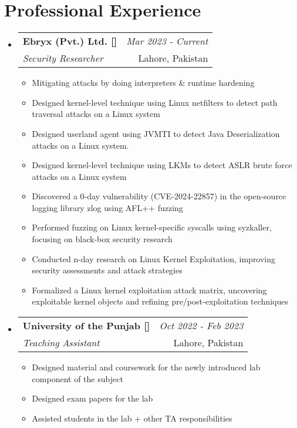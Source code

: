 \documentclass[a4paper,11pt]{article}
\makeatletter
\newcommand{\resumeSubheading}[4]{
\vspace{0.5mm}\item
    \begin{tabular*}{0.98\textwidth}[t]{l@{\extracolsep{\fill}}r}
        \textbf{#1} & \textit{\footnotesize{#4}} \\
        \textit{\footnotesize{#3}} &  \footnotesize{#2}\\
    \end{tabular*}
    \vspace{-2.4mm}
}
\newcommand{\resumeSubHeadingListStart}{\begin{itemize}[leftmargin=*,labelsep=1mm]}
\newcommand{\resumeItemListStart}{\begin{itemize}[leftmargin=*,labelsep=1mm,itemsep=0.5mm]}
\newcommand{\resumeSubHeadingListEnd}{\end{itemize}\vspace{2mm}}
\newcommand{\resumeItemListEnd}{\end{itemize}\vspace{-2mm}}
\makeatother
\begin{document}
\section{\textbf{Professional Experience}}
\vspace{-0.4mm}
  \resumeSubHeadingListStart
  \resumeSubheading
      {{Ebryx (Pvt.) Ltd. [\href{https://www.ebryx.com}{\faIcon{globe}}]}}{Lahore, Pakistan}
      {Security Researcher}{Mar 2023 - Current}
      \resumeItemListStart
        \item Mitigating attacks by doing interpreters \& runtime hardening
        \item Designed kernel-level technique using Linux netfilters to detect path traversal attacks on a Linux system
        \item Designed userland agent using JVMTI to detect Java Deserialization attacks on a Linux system.
        \item Designed kernel-level technique using LKMs to detect ASLR brute force attacks on a Linux system
        \item Discovered a 0-day vulnerability (CVE-2024-22857) in the open-source logging library zlog using AFL++ fuzzing
        \item Performed fuzzing on Linux kernel-specific syscalls using syzkaller, focusing on black-box security research
        \item Conducted n-day research on Linux Kernel Exploitation, improving security assessments and attack strategies
        \item Formalized a Linux kernel exploitation attack matrix, uncovering exploitable kernel objects and refining pre/post-exploitation techniques
      \resumeItemListEnd
  \resumeSubheading
    {University of the Punjab [\href{https://www.pu.edu.pk}{\faIcon{globe}}]}{Lahore, Pakistan}
    {Teaching Assistant}{Oct 2022 - Feb 2023}
    \resumeItemListStart
      \item Designed material and coursework for the newly introduced lab component of the subject
      \item Designed exam papers for the lab
      \item Assisted students in the lab + other TA responsibilities
    \resumeItemListEnd
  \resumeSubHeadingListEnd
\vspace{-6mm}
\end{document}
